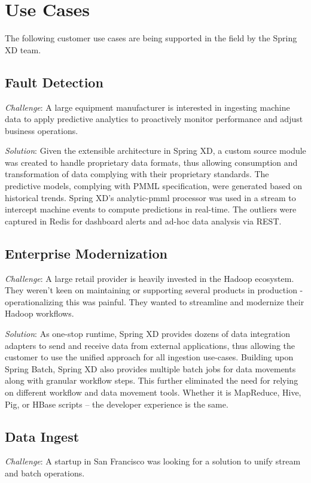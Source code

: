 \section{Use Cases}
The following customer use cases are being supported in the field by the
Spring XD team.

\subsection{Fault Detection}
\textit{Challenge}: A large equipment manufacturer is interested in
ingesting machine data to apply predictive analytics to proactively monitor
performance and adjust business operations.

\textit{Solution}: Given the extensible architecture in Spring XD, a custom
source module was created to handle proprietary data formats, thus allowing
consumption and transformation of data complying with their proprietary
standards. The predictive models, complying with PMML specification, were
generated based on historical trends. Spring XD's analytic-pmml processor was
used in a stream to intercept machine events to compute predictions in
real-time. The outliers were captured in Redis for dashboard alerts 
and ad-hoc data analysis via REST.

\subsection{Enterprise Modernization}
\textit{Challenge}: A large retail provider is heavily invested in the Hadoop
ecosystem. They weren't keen on maintaining or supporting several products in
production - operationalizing this was painful. They wanted to streamline and
modernize their Hadoop workflows.

\textit{Solution}: As one-stop runtime, Spring XD provides dozens of data
integration adapters to send and receive data from external applications, thus
allowing the customer to use the unified approach for all ingestion use-cases.
Building upon Spring Batch, Spring XD also provides multiple batch jobs for data
movements along with granular workflow steps. This further eliminated the need
for relying on different workflow and data movement tools. Whether it is 
MapReduce, Hive, Pig, or HBase scripts -- the developer experience is the same.

\subsection{Data Ingest}
\textit{Challenge}: A startup in San Francisco was looking for a solution to
unify stream and batch operations. 


